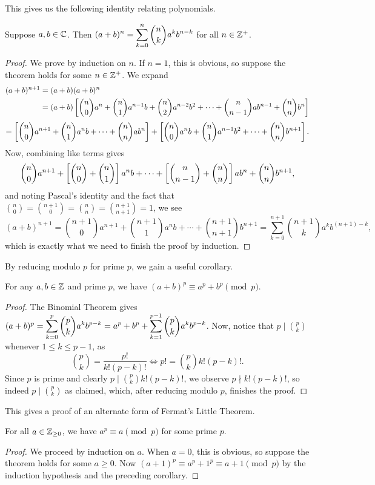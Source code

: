 \documentclass{article}
\begin{document}
This gives us the following identity relating polynomials.
\begin{theorem}
Suppose $a,b\in \mathbb C$. Then $\displaystyle(a+b)^n = \sum_{k=0}^n \binom nk a^k b^{n-k}$ for all $n\in\mathbb Z^+$.
\end{theorem}
\begin{proof}
We prove by induction on $n$. If $n=1$, this is obvious, so suppose the theorem holds for some $n\in\mathbb Z^+$. We expand
\begin{align*}
    (a+b)^{n+1} &= (a+b)(a+b)^n \\
    &= (a+b)\left[\binom n0a^n + \binom n1a^{n-1}b + \binom n2 a^{n-2}b^2 + \cdots + \binom n{n-1}ab^{n-1} + \binom nn b^n\right]
\end{align*}
$$=\left[\binom n0 a^{n+1} + \binom n1 a^nb + \cdots + \binom nnab^n\right] + \left[\binom n0 a^nb + \binom n1 a^{n-1}b^2 + \cdots + \binom nn b^{n+1}\right].$$
Now, combining like terms gives
$$\binom n0a^{n+1} + \left[\binom n0 + \binom n1\right] a^nb + \cdots + \left[\binom n{n-1}+\binom nn\right] ab^n + \binom nn b^{n+1},$$
and noting Pascal's identity and the fact that $\binom n0 = \binom{n+1}0 = \binom nn = \binom{n+1}{n+1} = 1$, we see
$$(a+b)^{n+1} = \binom{n+1}0a^{n+1} + \binom{n+1}1 a^nb + \cdots + \binom{n+1}{n+1}b^{n+1} = \sum_{k=0}^{n+1} \binom{n+1}k a^kb^{(n+1)-k},$$
which is exactly what we need to finish the proof by induction.
\end{proof}

By reducing modulo $p$ for prime $p$, we gain a useful corollary.
\begin{corollary}
For any $a,b\in \mathbb Z$ and prime $p$, we have $(a+b)^p \equiv a^p + b^p \pmod p$.
\end{corollary}
\begin{proof}
The Binomial Theorem gives $(a+b)^p =\displaystyle \sum_{k=0}^p \binom pka^kb^{p-k} = a^p + b^p + \sum_{k=1}^{p-1} \binom pk a^k b^{p-k}$. Now, notice that $p\mid \binom pk$ whenever $1\leq k \leq p-1$, as
$$\binom pk = \frac{p!}{k!(p-k)!} \iff p! = \binom pk k!(p-k)!.$$
Since $p$ is prime and clearly $p\mid \binom pkk!(p-k)!$, we observe $p\nmid k!(p-k)!$, so indeed $p\mid \binom pk$ as claimed, which, after reducing modulo $p$, finishes the proof.
\end{proof}

This gives a proof of an alternate form of Fermat's Little Theorem.
\begin{theorem}
For all $a\in \mathbb Z_{\geq 0}$, we have $a^p\equiv a\pmod p$ for some prime $p$.
\end{theorem}
\begin{proof}
We proceed by induction on $a$. When $a=0$, this is obvious, so suppose the theorem holds for some $a\geq 0$. Now $(a+1)^p \equiv a^p  +1^p \equiv a+1\pmod p$ by the induction hypothesis and the preceding corollary.
\end{proof}
\end{document}
